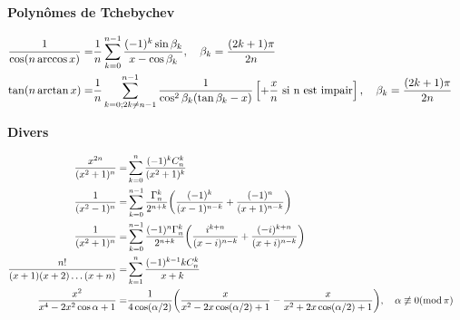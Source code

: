 {{\bigskip

\textbf{Polyn{\^o}mes de Tchebychev}

\begin{align*}
\FFF 1/{\cos(n\arccos x)}  =& \FFF1/n \sum_{k=0}^{n-1} \FFF (-1)^k\sin\beta_k/x-\cos\beta_k ,\quad \beta_k = \FFF(2k+1)\pi/2n \cr
\tan(n\arctan x)         =& \FFF1/n \sum_{k=0 ; 2k\ne n-1}^{n-1} \FFF1/\cos^2\beta_k(\tan\beta_k-x)
                              \left[ + \FFF x/n \ \text{si n est impair} \right],\quad \beta_k = \FFF(2k+1)\pi/2n \cr
\end{align*}

\bigskip

\textbf{Divers}

\begin{align*}
\FFF x^{2n}/{\CCC n}  =& \sum_{k=0}^n \FFF (-1)^kC_n^k/{\CCC k} \cr
\FFF 1/(x^2-1)^n    =& \sum_{k=0}^{n-1} \FFF \Gamma_n^k/2^{n+k} \biggl( \FFF (-1)^k/(x-1)^{n-k} + \FFF (-1)^n/(x+1)^{n-k} \biggr) \cr
\FFF 1/{\CCC n}      = & \sum_{k=0}^{n-1} \FFF (-1)^n\Gamma_n^k/2^{n+k} \biggl( \FFF {i^{k+n}}/(x-i)^{n-k} + \FFF {(-i)^{k+n}}/(x+i)^{n-k} \biggr) \cr
\FFF n!/(x+1)(x+2)\dots(x+n)  =& \sum_{k=1}^n \FFF (-1)^{k-1}kC_n^k/x+k \cr
\FFF x^2/x^4-2x^2\cos\alpha+1 =& \FFF1/4\cos(\alpha/2) \biggl(\FFF x/x^2-2x\cos(\alpha/2)+1 - \FFF x/x^2+2x\cos(\alpha/2)+1 \biggr), \quad \alpha\not\equiv0(\mathrm{mod}\,\pi)\cr
\end{align*}}
  \reponse{}
}
